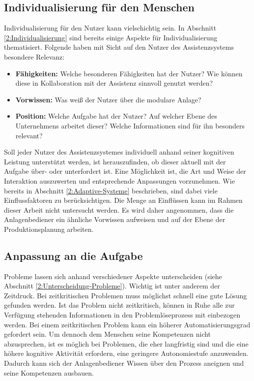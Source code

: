 \subsection{Individualisierung für den Menschen}
Individualisierung für den Nutzer kann vielschichtig sein. In Abschnitt \ref{2:Individualisierung} sind bereits einige Aspekte für Individualisierung thematisiert. Folgende haben mit Sicht auf den Nutzer des Assistenzsystems besondere Relevanz:
\begin{itemize}
\item \textbf{Fähigkeiten:} Welche besonderen Fähigkeiten hat der Nutzer? Wie können diese in Kollaboration mit der Assistenz sinnvoll genutzt werden?
\item \textbf{Vorwissen:} Was weiß der Nutzer über die modulare Anlage?
\item \textbf{Position:} Welche Aufgabe hat der Nutzer? Auf welcher Ebene des Unternehmens arbeitet dieser? Welche Informationen sind für ihn besonders relevant?
\end{itemize}
Soll jeder Nutzer des Assistenzsystemes individuell anhand seiner kognitiven Leistung unterstützt werden, ist herauszufinden, ob dieser aktuell mit der Aufgabe über- oder unterfordert ist. Eine Möglichkeit ist, die Art und Weise der Interaktion auszuwerten und entsprechende Anpassungen vorzunehmen. Wie bereits in Abschnitt \ref{2:Adaptive-Systeme} beschrieben, sind dabei viele Einflussfaktoren zu berücksichtigen. Die Menge an Einflüssen kann im Rahmen dieser Arbeit nicht untersucht werden. Es wird daher angenommen, dass die Anlagenbediener ein ähnliche Vorwissen aufweisen und auf der Ebene der Produktionsplanung arbeiten.

\subsection{Anpassung an die Aufgabe}
\label{3:Anpassung-Aufgabe}
Probleme lassen sich anhand verschiedener Aspekte unterscheiden (siehe Abschnitt \ref{2:Unterscheidung-Probleme}). Wichtig ist unter anderem der Zeitdruck. Bei zeitkritischen Problemen muss möglichst schnell eine gute Lösung gefunden werden. Ist das Problem nicht zeitkritisch, können in Ruhe alle zur Verfügung stehenden Informationen in den Problemlöseprozess mit einbezogen werden. Bei einem zeitkritischen Problem kann ein höherer Automatisierungsgrad gefordert sein. Um dennoch dem Menschen seine Kompetenzen nicht abzusprechen, ist es möglich bei Problemen, die eher langfristig sind und die eine höhere kognitive Aktivität erfordern, eine geringere Autonomiestufe anzuwenden. Dadurch kann sich der Anlagenbediener Wissen über den Prozess aneignen und seine Kompetenzen ausbauen.

